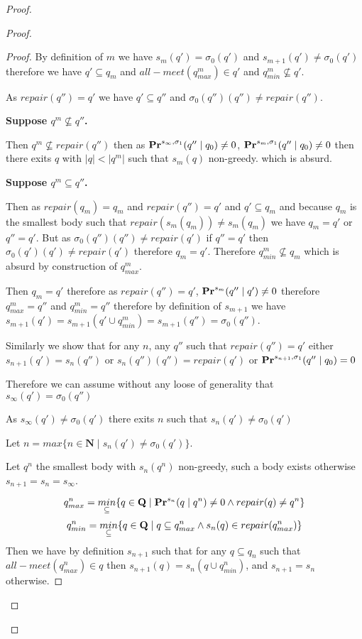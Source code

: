\begin{proof}
\begin{proof}
\begin{proof}
			
			
			By definition of $m$ we have $s_m(q') = \sigma_0(q')$ and $s_{m+1}(q') \neq \sigma_0(q')$ therefore we have $q' \subseteq q_m$ and $all-meet(q^m_{max}) \in q'$ and $q^m_{min} \not \subseteq q'$. 
			
			As $repair(q'') = q'$ we have $q' \subseteq q''$ and $\sigma_0(q'')(q'') \neq repair(q'')$.
			
			\textbf{Suppose $q^m \not \subseteq q''$.}
			
			Then $q^m \not \subseteq repair(q'')$ then as $\mathbf{Pr}^{s_{\infty},\sigma_1}(q'' \mid q_0) \neq 0$, $\mathbf{Pr}^{s_m,\sigma_1}(q'' \mid q_0) \neq 0$ then there exits $q$ with $|q| < |q^m|$ such that $s_m(q)$ non-greedy. which is absurd.
			
			\textbf{Suppose $q^m \subseteq q''$.}
			
			Then as $repair(q_m) = q_m$  and $repair(q'') = q'$ and $q' \subseteq q_m$  and because $q_m$ is the smallest body such that $repair(s_m(q_m)) \neq s_m(q_m)$ we have $q_m = q'$ or $q'' = q'$.  
			But as $\sigma_0(q'')(q'') \neq repair(q')$ if $q'' = q'$ then $\sigma_0(q')(q') \neq repair(q')$ therefore $q_m = q'$.
			Therefore $q^m_{min} \not \subseteq q_m$ which is absurd by construction of $q^m_{max}$.
			
			Then $q_m = q'$ therefore as $repair(q'') = q'$, $\mathbf{Pr}^{s_m}(q''\mid q') \neq 0$ therefore $q^m_{max} = q''$ and $q^m_{min} = q''$ therefore by definition of $s_{m+1}$ we have $s_{m+1}(q') = s_{m+1}(q' \cup q^m_{min}) = s_{m+1}(q'') =  \sigma_{0}(q'')$. 
			
			\bigskip
			Similarly we  show that for any $n$, any $q''$ such that $repair(q'') = q'$ either $s_{n+1}(q') = s_{n}(q'')$ or $s_{n}(q'')(q'') = repair(q')$ or $\mathbf{Pr}^{s_{n+1},\sigma_1}(q'' \mid q_0) = 0$
			
			Therefore we can assume without any loose of generality that $s_{\infty}(q') = \sigma_{0}(q'')$
			
			
			\iffalse
			As $s_{\infty}(q') \neq \sigma_0(q')$ there exits $n$ such that $s_n(q') \neq \sigma_{0}(q')$
			
			Let $n = max \{n \in \mathbf{N} \mid s_{n}(q') \neq \sigma_{0}(q') \}$.
			
			Let $q^n$  the smallest body with $s_n(q^n)$ non-greedy, such a body exists otherwise $s_{n+1} = s_{n} = s_{\infty}$.
			
			$$q^n_{max} = \underset{\subseteq}{min}\{q \in \mathbf{Q} \mid  \mathbf{Pr}^{s_n}(q\mid q^n)\neq 0 \land repair(q) \neq q^n \}$$
			$$q^n_{min} = \underset{\subseteq}{min}\{q \in \mathbf{Q} \mid  q \subseteq q^n_{max} \land s_n(q) \in repair(q^n_{max}) \}$$
			Then we have by definition $s_{n+1}$ such that for any $q \subseteq q_n$ such that $all-meet(q^n_{max}) \in q$ then $s_{n+1}(q) = s_n(q \cup q^n_{min})$, and $s_{n+1} = s_n$ otherwise.
			

\end{proof}
\end{proof}
\end{proof}
